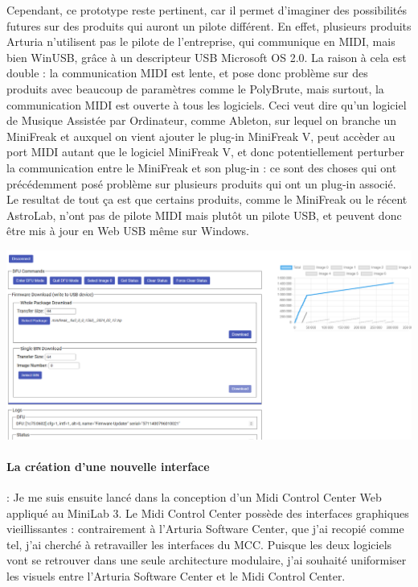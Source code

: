 \documentclass[francais]{rapportPFE}  %
\begin{document}
Cependant, ce prototype reste pertinent, car il permet d'imaginer des possibilités futures sur des produits qui auront un pilote différent.
En effet, plusieurs produits Arturia n'utilisent pas le pilote de l'entreprise, qui communique en MIDI, mais bien WinUSB, grâce à un descripteur USB Microsoft OS 2.0. La raison à cela est double : la communication MIDI est lente, et pose donc problème sur des produits avec beaucoup de paramètres comme le PolyBrute, mais surtout, la communication MIDI est ouverte à tous les logiciels. Ceci veut dire qu'un logiciel de Musique Assistée par Ordinateur, comme Ableton, sur lequel on branche un MiniFreak et auxquel on vient ajouter le plug-in MiniFreak V, peut accèder au port MIDI autant que le logiciel MiniFreak V, et donc potentiellement perturber la communication entre le MiniFreak et son plug-in : ce sont des choses qui ont précédemment posé problème sur plusieurs produits qui ont un plug-in associé.
Le resultat de tout ça est que certains produits, comme le MiniFreak ou le récent AstroLab, n'ont pas de pilote MIDI mais plutôt un pilote USB, et peuvent donc être mis à jour en Web USB même sur Windows.



\begin{center}
	\centering
	\includegraphics[width=15cm]{graphics/dfu.png}
	\begin{tiny}
	\end{tiny}
	\label{fig}
\end{center}


\paragraph{La création d'une nouvelle interface}:
Je me suis ensuite lancé dans la conception d'un Midi Control Center Web appliqué au MiniLab 3.
Le Midi Control Center possède des interfaces graphiques vieillissantes : contrairement à l'Arturia Software Center, que j'ai recopié comme tel, j'ai cherché à retravailler les interfaces du MCC. Puisque les deux logiciels vont se retrouver dans une seule architecture modulaire, j'ai souhaité uniformiser les visuels entre l'Arturia Software Center et le Midi Control Center.
\end{document}
